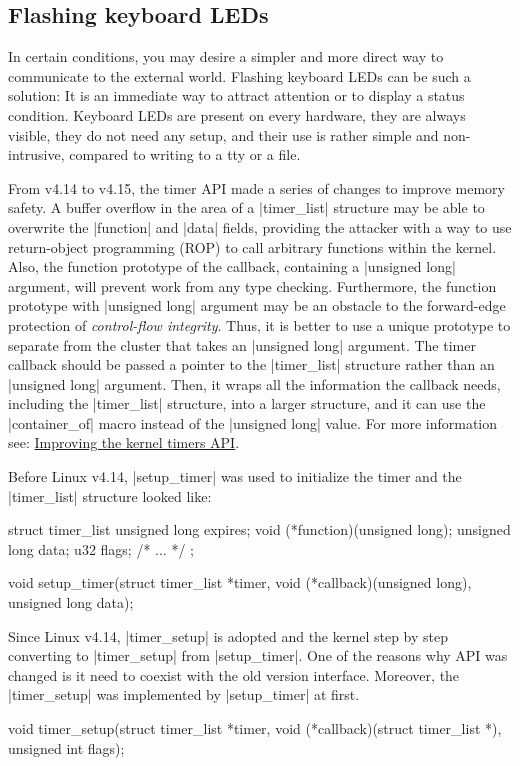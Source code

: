 \documentclass[10pt, oneside]{book}
\begin{document}
\subsection{Flashing keyboard LEDs}
\label{sec:flash_kb_led}
In certain conditions, you may desire a simpler and more direct way to communicate to the external world.
Flashing keyboard LEDs can be such a solution: It is an immediate way to attract attention or to display a status condition.
Keyboard LEDs are present on every hardware, they are always visible, they do not need any setup, and their use is rather simple and non-intrusive, compared to writing to a tty or a file.

From v4.14 to v4.15, the timer API made a series of changes to improve memory safety.
A buffer overflow in the area of a \cpp|timer_list| structure may be able to overwrite the \cpp|function| and \cpp|data| fields, providing the attacker with a way to use return-object programming (ROP) to call arbitrary functions within the kernel.
Also, the function prototype of the callback, containing a \cpp|unsigned long| argument, will prevent work from any type checking.
Furthermore, the function prototype with \cpp|unsigned long| argument may be an obstacle to the forward-edge protection of \textit{control-flow integrity}.
Thus, it is better to use a unique prototype to separate from the cluster that takes an \cpp|unsigned long| argument.
The timer callback should be passed a pointer to the \cpp|timer_list| structure rather than an \cpp|unsigned long| argument.
Then, it wraps all the information the callback needs, including the \cpp|timer_list| structure, into a larger structure, and it can use the \cpp|container_of| macro instead of the \cpp|unsigned long| value.
For more information see: \href{https://lwn.net/Articles/735887/}{Improving the kernel timers API}.

Before Linux v4.14, \cpp|setup_timer| was used to initialize the timer and the \cpp|timer_list| structure looked like:
\begin{code}
struct timer_list {
    unsigned long expires;
    void (*function)(unsigned long);
    unsigned long data;
    u32 flags;
    /* ... */
};

void setup_timer(struct timer_list *timer, void (*callback)(unsigned long),
                 unsigned long data);
\end{code}

Since Linux v4.14, \cpp|timer_setup| is adopted and the kernel step by step converting to \cpp|timer_setup| from \cpp|setup_timer|.
One of the reasons why API was changed is it need to coexist with the old version interface.
Moreover, the \cpp|timer_setup| was implemented by \cpp|setup_timer| at first.
\begin{code}
void timer_setup(struct timer_list *timer,
                 void (*callback)(struct timer_list *), unsigned int flags);
\end{code}
\end{document}

